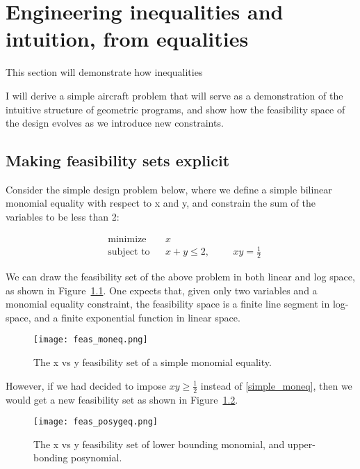 \chapter{Engineering inequalities and intuition, from equalities}

This section will demonstrate how inequalities

I will derive a simple aircraft problem that will serve as
a demonstration of the intuitive structure of geometric programs, and show
how the feasibility space of the design evolves as we introduce new constraints.

\section{Making feasibility sets explicit}

Consider the simple design problem below, where we define a simple bilinear
monomial equality with respect to x and y, and constrain the sum of the variables
to be less than 2:

\begin{equation*}
\begin{aligned}
& {\text{minimize}}
& & x \\
& \text{subject to}
& & x + y \leq 2,
    & & & xy = \frac{1}{2} \label{simple_moneq}
\end{aligned}
\end{equation*}

We can draw the feasibility set of the above problem in both linear and log space,
as shown in Figure~\ref{f:feas_moneq}. One expects that, given only two variables
and a monomial equality constraint, the feasibility space is
a finite line segment in log-space, and a finite exponential function in linear space.

\begin{figure}
    \centering
    \texttt{[image: feas\_moneq.png]}
    \caption{The x vs y feasibility set of a simple monomial equality.}
    \label{f:feas_moneq}
\end{figure}

However, if we had decided to impose $xy \geq \frac{1}{2}$ instead of \ref{simple_moneq},
then we would get a new feasibility set as shown in Figure~\ref{f:feas_posygeq}.

\begin{figure}
    \centering
    \texttt{[image: feas\_posygeq.png]}
    \caption{The x vs y feasibility set of lower bounding monomial,
    and upper-bonding posynomial.}
    \label{f:feas_posygeq}
\end{figure}

